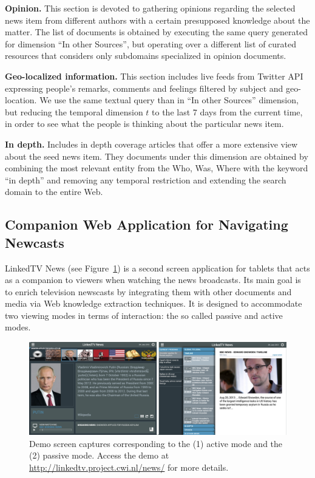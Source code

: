 \documentclass[a4paper,11pt]{report}
\begin{document}
\textbf{Opinion.} This section is devoted to gathering opinions regarding the selected news item from different authors with a certain presupposed knowledge about the matter. The list of documents is obtained by executing the same query generated for dimension ``In other Sources'', but operating over a different list of curated resources that considers only subdomains specialized in opinion documents.

\textbf{Geo-localized information.} This section includes live feeds from Twitter API expressing people's remarks, comments and feelings filtered by subject and geo-location. We use the same textual query than in ``In other Sources'' dimension, but reducing the temporal dimension $t$ to the last 7 days from the current time, in order to see what the people is thinking about the particular news item.

\textbf{In depth.} Includes in depth coverage articles that offer a more extensive view about the seed news item. They documents under this dimension are obtained by combining the most relevant entity from the Who, Was, Where with the keyword ``in depth'' and removing any temporal restriction and extending the search domain to the entire Web. 

\subsection* {Companion Web Application for Navigating Newcasts}

LinkedTV News (see Figure~\ref{fig:DemoScreen}) is a second screen application for tablets that acts as a companion to viewers when watching the news broadcasts. Its main goal is to enrich television newscasts by integrating them with other documents and media via Web knowledge extraction techniques. It is designed to accommodate two viewing modes in terms of interaction: the so called passive and active modes. 

\begin{figure}[h!]
\centering
\includegraphics[width=1\textwidth]{figure/DemoScreen}
\caption{Demo screen captures corresponding to the (1) active mode and the (2) passive mode. Access the demo at \protect\url{http://linkedtv.project.cwi.nl/news/} for more details.}
\label{fig:DemoScreen}%
\end{figure}
\end{document}
